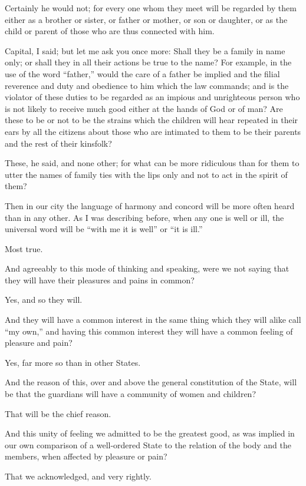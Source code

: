 Certainly he would not; for every one whom they meet will be regarded
by them either as a brother or sister, or father or mother, or son or
daughter, or as the child or parent of those who are thus connected with
him.

Capital, I said; but let me ask you once more: Shall they be a family in
name only; or shall they in all their actions be true to the name? For
example, in the use of the word ``father,'' would the care of a father be
implied and the filial reverence and duty and obedience to him which the
law commands; and is the violator of these duties to be regarded as an
impious and unrighteous person who is not likely to receive much good
either at the hands of God or of man? Are these to be or not to be the
strains which the children will hear repeated in their ears by all the
citizens about those who are intimated to them to be their parents and
the rest of their kinsfolk?

These, he said, and none other; for what can be more ridiculous than for
them to utter the names of family ties with the lips only and not to act
in the spirit of them?

Then in our city the language of harmony and concord will be more often
heard than in any other. As I was describing before, when any one is
well or ill, the universal word will be ``with me it is well'' or ``it is
ill.''

Most true.

And agreeably to this mode of thinking and speaking, were we not saying
that they will have their pleasures and pains in common?

Yes, and so they will.

And they will have a common interest in the same thing which they will
alike call ``my own,'' and having this common interest they will have a
common feeling of pleasure and pain?

Yes, far more so than in other States.

And the reason of this, over and above the general constitution of the
State, will be that the guardians will have a community of women and
children?

That will be the chief reason.

And this unity of feeling we admitted to be the greatest good, as was
implied in our own comparison of a well-ordered State to the relation of
the body and the members, when affected by pleasure or pain?

That we acknowledged, and very rightly.

